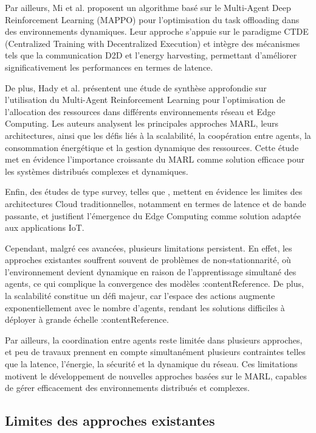 \documentclass[12pt,a4paper]{report}
\begin{document}
Par ailleurs, Mi et al. \cite{mi2024} proposent un algorithme basé sur le Multi-Agent Deep Reinforcement Learning (MAPPO) pour l’optimisation du task offloading dans des environnements dynamiques. Leur approche s’appuie sur le paradigme CTDE (Centralized Training with Decentralized Execution) et intègre des mécanismes tels que la communication D2D et l’energy harvesting, permettant d’améliorer significativement les performances en termes de latence.

De plus, Hady et al. \cite{marl_resource2025} présentent une étude de synthèse approfondie sur l’utilisation du Multi-Agent Reinforcement Learning pour l’optimisation de l’allocation des ressources dans différents environnements réseau et Edge Computing. Les auteurs analysent les principales approches MARL, leurs architectures, ainsi que les défis liés à la scalabilité, la coopération entre agents, la consommation énergétique et la gestion dynamique des ressources. Cette étude met en évidence l’importance croissante du MARL comme solution efficace pour les systèmes distribués complexes et dynamiques.

Enfin, des études de type survey, telles que \cite{mecsurvey}, mettent en évidence les limites des architectures Cloud traditionnelles, notamment en termes de latence et de bande passante, et justifient l’émergence du Edge Computing comme solution adaptée aux applications IoT.

Cependant, malgré ces avancées, plusieurs limitations persistent. En effet, les approches existantes souffrent souvent de problèmes de non-stationnarité, où l’environnement devient dynamique en raison de l’apprentissage simultané des agents, ce qui complique la convergence des modèles :contentReference. De plus, la scalabilité constitue un défi majeur, car l’espace des actions augmente exponentiellement avec le nombre d’agents, rendant les solutions difficiles à déployer à grande échelle :contentReference.

Par ailleurs, la coordination entre agents reste limitée dans plusieurs approches, et peu de travaux prennent en compte simultanément plusieurs contraintes telles que la latence, l’énergie, la sécurité et la dynamique du réseau. Ces limitations motivent le développement de nouvelles approches basées sur le MARL, capables de gérer efficacement des environnements distribués et complexes.

\subsection{Limites des approches existantes}
\end{document}
